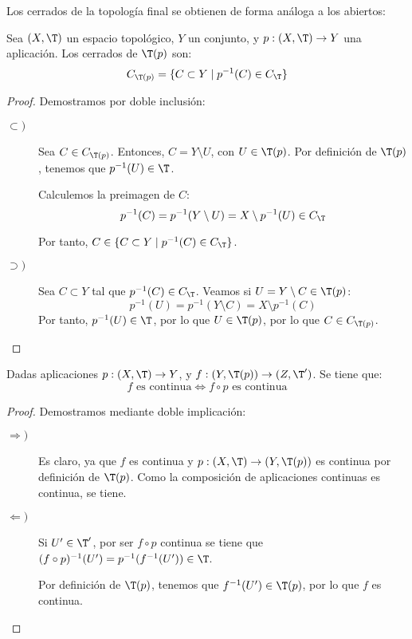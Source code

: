 Los cerrados de la topología final se obtienen de forma análoga a los abiertos:
\begin{prop}
    Sea $(X,\T)$ un espacio topológico, $Y$ un conjunto, y $p:(X,\T)\to Y$ una aplicación. Los cerrados de $\T(p)$ son:
    $$C_{\T(p)}=\{C\subset Y\mid p^{-1}(C)\in C_\T\}$$
\end{prop}
\begin{proof}
    Demostramos por doble inclusión:
    \begin{description}
        \item[$\subset)$] Sea $C\in C_{\T(p)}$. Entonces, $C=Y\setminus U$, con $U\in \T(p)$. Por definición de $\T(p)$, tenemos que $p^{-1}(U)\in \T$.

        Calculemos la preimagen de $C$:
        \begin{equation*}
            p^{-1}(C) = p^{-1}(Y\setminus U) = X\setminus p^{-1}(U)\in C_\T
        \end{equation*}

        Por tanto, $C\in \{C\subset Y\mid p^{-1}(C)\in C_\T\}$.

        \item[$\supset)$] Sea $C\subset Y$ tal que $p^{-1}(C)\in C_\T$. Veamos si $U=Y\setminus C\in \T(p)$:
        \begin{equation*}
            p^{-1}(U)=p^{-1}(Y\setminus C) = X\setminus p^{-1}(C)
        \end{equation*}
        Por tanto, $p^{-1}(U)\in \T$, por lo que $U\in \T(p)$, por lo que $C\in C_{\T(p)}$.
    \end{description}
\end{proof}

\begin{prop}
    Dadas aplicaciones $p:(X,\T)\to Y$, y $f:(Y,\T(p))\to (Z,\T')$. Se tiene que:
    \begin{equation*}
        f \text{ es continua} \Longleftrightarrow
        f\circ p \text{ es continua}
    \end{equation*}
\end{prop}
\begin{proof}
    Demostramos mediante doble implicación:
    \begin{description}
        \item[$\Longrightarrow)$] Es claro, ya que $f$ es continua y $p:(X,\T)\to (Y,\T(p))$ es continua por definición de $\T(p)$. Como la composición de aplicaciones continuas es continua, se tiene.

        \item[$\Longleftarrow)$] Si $U'\in \T'$, por ser $f\circ p$ continua se tiene que $(f\circ p)^{-1}(U')=p^{-1}(f^{-1}(U'))\in \T$.

        Por definición de $\T(p)$, tenemos que $f^{-1}(U')\in \T(p)$, por lo que $f$ es continua.
    \end{description}
\end{proof}

